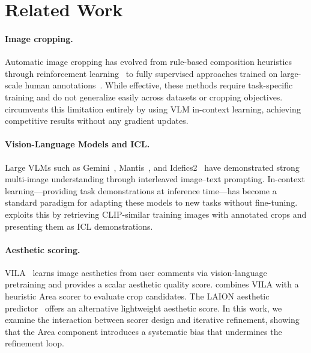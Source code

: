 \section{Related Work}
\label{sec:related}

\paragraph{Image cropping.}
Automatic image cropping has evolved from rule-based composition
heuristics~\cite{cgs2017} through reinforcement
learning~\cite{a2rl2018} to fully supervised approaches trained on
large-scale human annotations~\cite{gaic2019, gaicd2020}.  While
effective, these methods require task-specific training and do not
generalize easily across datasets or cropping objectives.
\baseline~\cite{cropper2025} circumvents this limitation entirely by
using VLM in-context learning, achieving competitive results without any
gradient updates.

\paragraph{Vision-Language Models and ICL.}
Large VLMs such as Gemini~\cite{gemini2024},
Mantis~\cite{mantis2024}, and Idefics2~\cite{idefics2} have
demonstrated strong multi-image understanding through interleaved
image--text prompting.  In-context learning---providing task
demonstrations at inference time---has become a standard paradigm for
adapting these models to new tasks without fine-tuning.  \baseline
exploits this by retrieving CLIP-similar training images with annotated
crops and presenting them as ICL demonstrations.

\paragraph{Aesthetic scoring.}
VILA~\cite{vila2024} learns image aesthetics from user comments via
vision-language pretraining and provides a scalar aesthetic quality
score.  \baseline combines VILA with a heuristic Area scorer to evaluate
crop candidates.  The LAION aesthetic predictor~\cite{laion_aes2022}
offers an alternative lightweight aesthetic score.  In this work, we
examine the interaction between scorer design and iterative refinement,
showing that the Area component introduces a systematic bias that
undermines the refinement loop.
